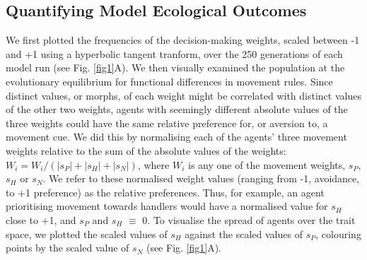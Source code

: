 
\subsection*{Quantifying Model Ecological Outcomes}

We first plotted the frequencies of the decision-making weights, scaled between -1 and +1 using a hyperbolic tangent tranform, over the 250 generations of each model run (see Fig. \ref{fig1}A).
We then visually examined the population at the evolutionary equilibrium for functional differences in movement rules.
Since distinct values, or morphs, of each weight might be correlated with distinct values of the other two weights, agents with seemingly different absolute values of the three weights could have the same relative preference for, or aversion to, a movement cue.
We did this by normalising each of the agents' three movement weights relative to the sum of the absolute values of the weights:
$W_i = W_i / (|s_P| + |s_H| + |s_N|)$, where $W_i$ is any one of the movement weights, $s_P$, $s_H$ or $s_N$.
We refer to these normalised weight values (ranging from -1, avoidance, to +1 preference) as the relative preferences.
Thus, for example, an agent prioritising movement towards handlers would have a normalised value for $s_H$ close to +1, and $s_P$ and $s_H$ $\equiv$ 0.
To visualise the spread of agents over the trait space, we plotted the scaled values of $s_H$ against the scaled values of $s_P$, colouring points by the scaled value of $s_N$ (see Fig. \ref{fig1}A).
    
